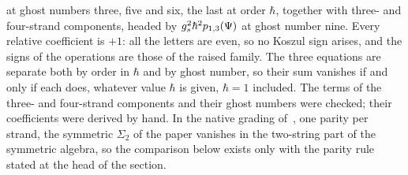 at ghost numbers three, five and six, the last at order $\hbar$, together with three- and four-strand components, headed by $g_s^2 \hbar^2 p_{1,3}(\Psi)$ at ghost number nine.
Every relative coefficient is $+ 1$: all the letters are even, so no Koszul sign arises, and the signs of the operations are those of the raised family.
The three equations are separate both by order in $\hbar$ and by ghost number, so their sum vanishes if and only if each does, whatever value $\hbar$ is given, $\hbar = 1$ included.
The terms of the three- and four-strand components and their ghost numbers were checked; their coefficients were derived by hand.
In the native grading of~\cite{Cieliebak:2015:HomologicalAlgebraRelated}, one parity per strand, the symmetric $\Sigma_2$ of the paper vanishes in the two-string part of the symmetric algebra, so the comparison below exists only with the parity rule stated at the head of the section.

